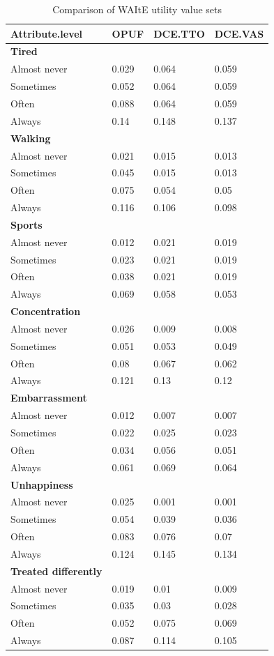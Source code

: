 \documentclass[
  letterpaper,
  DIV=11,
  numbers=noendperiod]{scrartcl}
\begin{document}
\begin{longtable}[]{@{}llll@{}}

\caption{\label{tbl-WAItEvalsets}Comparison of WAItE utility value sets}

\tabularnewline

\toprule\noalign{}
Attribute.level & OPUF & DCE.TTO & DCE.VAS \\
\midrule\noalign{}
\endhead
\bottomrule\noalign{}
\endlastfoot
\textbf{Tired} & \textbf{} & \textbf{} & \textbf{} \\
Almost never & 0.029 & 0.064 & 0.059 \\
Sometimes & 0.052 & 0.064 & 0.059 \\
Often & 0.088 & 0.064 & 0.059 \\
Always & 0.14 & 0.148 & 0.137 \\
\textbf{Walking} & \textbf{} & \textbf{} & \textbf{} \\
Almost never & 0.021 & 0.015 & 0.013 \\
Sometimes & 0.045 & 0.015 & 0.013 \\
Often & 0.075 & 0.054 & 0.05 \\
Always & 0.116 & 0.106 & 0.098 \\
\textbf{Sports} & \textbf{} & \textbf{} & \textbf{} \\
Almost never & 0.012 & 0.021 & 0.019 \\
Sometimes & 0.023 & 0.021 & 0.019 \\
Often & 0.038 & 0.021 & 0.019 \\
Always & 0.069 & 0.058 & 0.053 \\
\textbf{Concentration} & \textbf{} & \textbf{} & \textbf{} \\
Almost never & 0.026 & 0.009 & 0.008 \\
Sometimes & 0.051 & 0.053 & 0.049 \\
Often & 0.08 & 0.067 & 0.062 \\
Always & 0.121 & 0.13 & 0.12 \\
\textbf{Embarrassment} & \textbf{} & \textbf{} & \textbf{} \\
Almost never & 0.012 & 0.007 & 0.007 \\
Sometimes & 0.022 & 0.025 & 0.023 \\
Often & 0.034 & 0.056 & 0.051 \\
Always & 0.061 & 0.069 & 0.064 \\
\textbf{Unhappiness} & \textbf{} & \textbf{} & \textbf{} \\
Almost never & 0.025 & 0.001 & 0.001 \\
Sometimes & 0.054 & 0.039 & 0.036 \\
Often & 0.083 & 0.076 & 0.07 \\
Always & 0.124 & 0.145 & 0.134 \\
\textbf{Treated differently} & \textbf{} & \textbf{} & \textbf{} \\
Almost never & 0.019 & 0.01 & 0.009 \\
Sometimes & 0.035 & 0.03 & 0.028 \\
Often & 0.052 & 0.075 & 0.069 \\
Always & 0.087 & 0.114 & 0.105 \\


\end{longtable}
\end{document}
